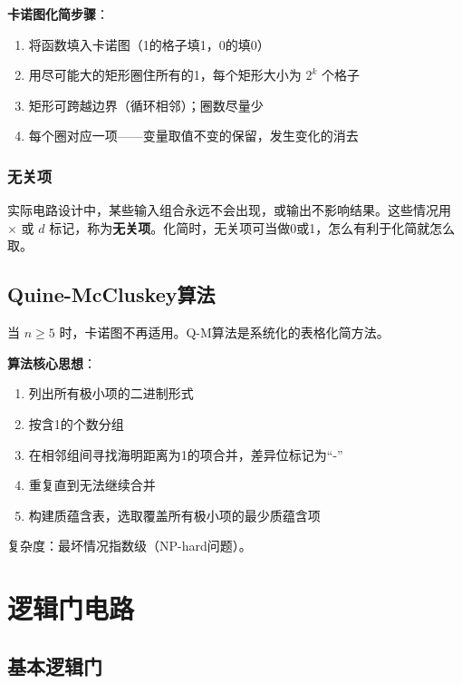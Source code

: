 \textbf{卡诺图化简步骤}：

\begin{enumerate}
    \item 将函数填入卡诺图（1的格子填1，0的填0）
    \item 用尽可能大的矩形圈住所有的1，每个矩形大小为 \(2^k\) 个格子
    \item 矩形可跨越边界（循环相邻）；圈数尽量少
    \item 每个圈对应一项——变量取值不变的保留，发生变化的消去
\end{enumerate}

\subsubsection{无关项}

实际电路设计中，某些输入组合永远不会出现，或输出不影响结果。这些情况用 \(\times\) 或 \(d\) 标记，称为\textbf{无关项}。化简时，无关项可当做0或1，怎么有利于化简就怎么取。

\subsection{Quine-McCluskey算法}

当 \(n\geq 5\) 时，卡诺图不再适用。Q-M算法是系统化的表格化简方法。

\vspace{4pt}
\textbf{算法核心思想}：
\begin{enumerate}
    \item 列出所有极小项的二进制形式
    \item 按含1的个数分组
    \item 在相邻组间寻找海明距离为1的项合并，差异位标记为``-''
    \item 重复直到无法继续合并
    \item 构建质蕴含表，选取覆盖所有极小项的最少质蕴含项
\end{enumerate}

复杂度：最坏情况指数级（NP-hard问题）。

\section{逻辑门电路}

\subsection{基本逻辑门}

